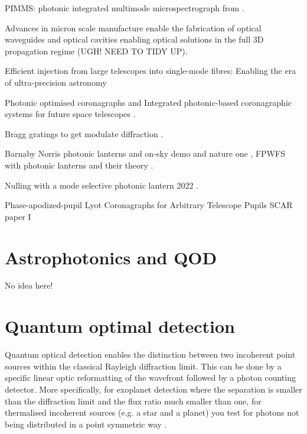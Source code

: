 \documentclass[letterpaper]{ar-1col}
\begin{document}

PIMMS: photonic integrated multimode microspectrograph from \citet{Bland-Hawthorn10}.

Advances in micron scale manufacture enable the fabrication of optical waveguides and optical cavities enabling optical solutions in the full 3D propagation regime (UGH! NEED TO TIDY UP).

Efficient injection from large telescopes into single-mode fibres: Enabling the era of ultra-precision astronomy \citep{Jovanovic17}

Photonic optimised coronagraphs and Integrated photonic-based coronagraphic systems for future space telescopes
 \citep{Desai23a}.


Bragg gratings to get modulate diffraction \citep{FaggingerAuer24}.

Barnaby Norris photonic lanterns \citep{Norris22} and on-sky demo \citep{Norris20} and nature one \cite{Norris20a}, FPWFS with photonic lanterns \citep{Lin20} and their theory \citep{Lin22}.

Nulling with a mode selective photonic lantern 2022 \citep{Xin22}.

Phase-apodized-pupil Lyot Coronagraphs for Arbitrary Telescope Pupils \citep{Por20}
SCAR paper I \citep{Por20a}


\lipsum[2-4]

\section{Astrophotonics and QOD}

No idea here!

\lipsum[2-4]

\section{Quantum optimal detection}

Quantum optical detection \citep{Lu18} enables the distinction between two incoherent point sources within the classical Rayleigh diffraction limit.
%
This can be done by a specific linear optic reformatting of the wavefront followed by a photon counting detector.
%
More specifically, for exoplanet detection where the separation is smaller than the diffraction limit and the flux ratio much smaller than one, for thermalised incoherent sources (e.g. a star and a planet) you test for photons not being distributed in a point symmetric way \citep[e.g. ][]{Huang21}.
\end{document}
